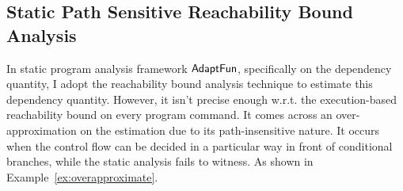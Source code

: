 \subsection{Static Path Sensitive Reachability Bound Analysis}
\label{subsec:furthers-reachability}
In static program analysis framework $\textsf{AdaptFun}$, specifically on the dependency quantity, 
I adopt the reachability bound analysis technique to estimate this dependency quantity.
However, it isn't precise enough w.r.t. the execution-based reachability bound on every program command.
It comes across an over-approximation on the estimation due to its path-insensitive nature. 
It occurs when the control flow can be decided in a particular way in front of conditional branches, 
while the static analysis fails to witness. 
As shown in Example~\ref{ex:overapproximate}.


